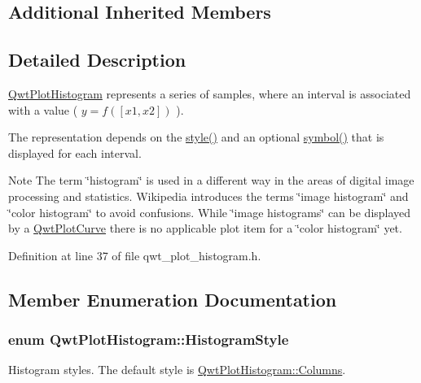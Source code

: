 \subsection*{Additional Inherited Members}


\subsection{Detailed Description}
\hyperlink{class_qwt_plot_histogram}{Qwt\-Plot\-Histogram} represents a series of samples, where an interval is associated with a value ( $y = f([x1,x2])$ ). 

The representation depends on the \hyperlink{class_qwt_plot_histogram_a00915a951baa4fb251f5614cb0dd8aa9}{style()} and an optional \hyperlink{class_qwt_plot_histogram_a5815e991c891210789fef0295047f790}{symbol()} that is displayed for each interval.

\begin{DoxyNote}{Note}
The term \char`\"{}histogram\char`\"{} is used in a different way in the areas of digital image processing and statistics. Wikipedia introduces the terms \char`\"{}image histogram\char`\"{} and \char`\"{}color histogram\char`\"{} to avoid confusions. While \char`\"{}image histograms\char`\"{} can be displayed by a \hyperlink{class_qwt_plot_curve}{Qwt\-Plot\-Curve} there is no applicable plot item for a \char`\"{}color histogram\char`\"{} yet. 
\end{DoxyNote}


Definition at line 37 of file qwt\-\_\-plot\-\_\-histogram.\-h.



\subsection{Member Enumeration Documentation}
\hypertarget{class_qwt_plot_histogram_a3ba21c3aef994daf7b848ccf71b0dbc5}{
\subsubsection[{Histogram\-Style}]{\setlength{\rightskip}{0pt plus 5cm}enum {\bf Qwt\-Plot\-Histogram\-::\-Histogram\-Style}}}\label{class_qwt_plot_histogram_a3ba21c3aef994daf7b848ccf71b0dbc5}
Histogram styles. The default style is \hyperlink{class_qwt_plot_histogram_a3ba21c3aef994daf7b848ccf71b0dbc5a9cd056b6b9881b07c625756488487362}{Qwt\-Plot\-Histogram\-::\-Columns}.

